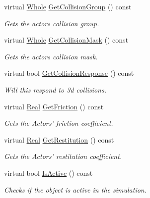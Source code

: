 \begin{DoxyCompactItemize}
virtual \hyperlink{namespacephys_a460f6bc24c8dd347b05e0366ae34f34a}{Whole} \hyperlink{classphys_1_1ActorBasePhysicsSettings_a6090c93f35beea7c82550076a17aef24}{GetCollisionGroup} () const 
\begin{DoxyCompactList}\small\item\em Gets the actors collision group. \item\end{DoxyCompactList}\item 
virtual \hyperlink{namespacephys_a460f6bc24c8dd347b05e0366ae34f34a}{Whole} \hyperlink{classphys_1_1ActorBasePhysicsSettings_a8a3a7ca225dd9697495bcc7d51b0942a}{GetCollisionMask} () const 
\begin{DoxyCompactList}\small\item\em Gets the actors collision mask. \item\end{DoxyCompactList}\item 
virtual bool \hyperlink{classphys_1_1ActorBasePhysicsSettings_aa131aa28b9e5c7a53c65c4e229f13ed1}{GetCollisionResponse} () const 
\begin{DoxyCompactList}\small\item\em Will this respond to 3d collisions. \item\end{DoxyCompactList}\item 
virtual \hyperlink{namespacephys_af7eb897198d265b8e868f45240230d5f}{Real} \hyperlink{classphys_1_1ActorBasePhysicsSettings_ad38f4ccdbc0ecf997bb9745c23961f6d}{GetFriction} () const 
\begin{DoxyCompactList}\small\item\em Gets the Actors' friction coefficient. \item\end{DoxyCompactList}\item 
virtual \hyperlink{namespacephys_af7eb897198d265b8e868f45240230d5f}{Real} \hyperlink{classphys_1_1ActorBasePhysicsSettings_a937e66bb0293c4162fae48d9e37196f4}{GetRestitution} () const 
\begin{DoxyCompactList}\small\item\em Gets the Actors' restitution coefficient. \item\end{DoxyCompactList}\item 
virtual bool \hyperlink{classphys_1_1ActorBasePhysicsSettings_aeb966cf55b9b626897731f42b5a2fc64}{IsActive} () const 
\begin{DoxyCompactList}\small\item\em Checks if the object is active in the simulation. \item\end{DoxyCompactList}\item 

\end{DoxyCompactItemize}
